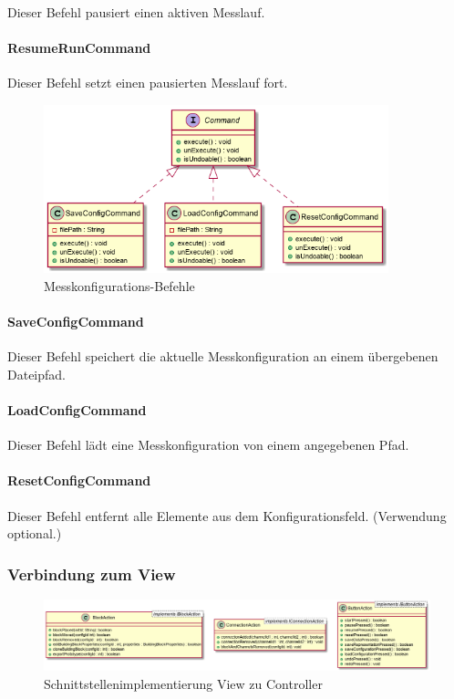 \documentclass[parskip=full]{scrartcl}
\begin{document}
Dieser Befehl pausiert einen aktiven Messlauf.

\paragraph{ResumeRunCommand}

Dieser Befehl setzt einen pausierten Messlauf fort.

\begin{figure}[htbp]
	\begin{center}
		\includegraphics[width = 10cm]{Grafiken/Commands4.png}
		\caption{Messkonfigurations-Befehle}
		\label{Commands4}
	\end{center}
\end{figure}

\paragraph{SaveConfigCommand}

Dieser Befehl speichert die aktuelle Messkonfiguration an einem übergebenen Dateipfad.

\paragraph{LoadConfigCommand}

Dieser Befehl lädt eine Messkonfiguration von einem angegebenen Pfad.

\paragraph{ResetConfigCommand}

Dieser Befehl entfernt alle Elemente aus dem Konfigurationsfeld. (Verwendung optional.)

\subsubsection{Verbindung zum View}

\begin{figure}[htbp]
	\begin{center}
		\includegraphics[width = 14cm]{Grafiken/View_Controller_Interface.png}
		\caption{Schnittstellenimplementierung View zu Controller}
		\label{View_Controller_Interface}
	\end{center}
\end{figure}
\end{document}
